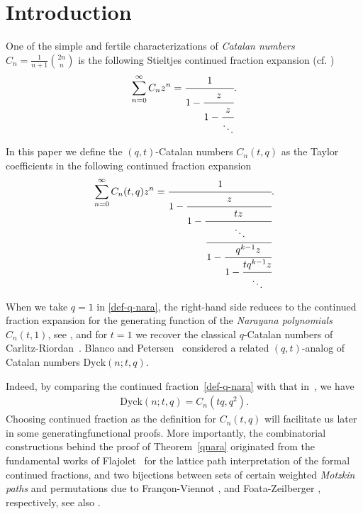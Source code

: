 \documentclass[12pt,reqno]{amsart}
\numberwithin{equation}{section}
\theoremstyle{plain}
\theoremstyle{definition}
\def\Dyck{\text{Dyck}}
\begin{document}
\tableofcontents


\section{Introduction}\label{sec1: Intro}









One of the simple and fertile characterizations of \emph{Catalan numbers} $C_n=\frac{1}{n+1}{2n\choose n}$ is  the following Stieltjes continued fraction expansion (cf. \cite{BCS08,Fl80})
\begin{align*}
\sum_{n=0}^\infty C_n z^n=
\cfrac{1}{
1-\cfrac{z}{1-\cfrac{z}{
\ddots}}}.
\end{align*}

 In this paper we
define  the  $(q,t)$-Catalan  numbers $C_n(t,q)$ as the Taylor coefficients in the following continued fraction expansion
\begin{equation}\label{def-q-nara}
\sum_{n=0}^\infty C_n(t,q) z^n=
\cfrac{1}{
1-\cfrac{z}{1-\cfrac{tz}{
\cfrac{\ddots}{1-\cfrac{q^{k-1}z}{1-\cfrac{tq^{k-1}z}{\ddots}
}}}}}.





\end{equation}

When we take $q=1$ in \eqref{def-q-nara}, the right-hand side reduces to the continued fraction expansion for the generating function of the \emph{Narayana polynomials} $C_n(t,1)$, see \cite{BCS08}, and for $t=1$ we recover the classical $q$-Catalan numbers of Carlitz-Riordan~\cite{CR64}. Blanco and Petersen~\cite{BP14} considered a related $(q,t)$-analog of Catalan numbers $\Dyck(n; t,q)$.
 






Indeed, by comparing the continued fraction~\eqref{def-q-nara} with that in~\cite[Proposition~2.6]{BP14},  we have
 \begin{align}\label{comb2-q-nara}
\Dyck(n; t,q)=C_n(tq,q^2).
\end{align}
Choosing continued fraction as the definition for $C_n(t,q)$ will facilitate us later in some generatingfunctional proofs. More importantly, the combinatorial constructions behind the proof of Theorem~\ref{qnara} originated from the fundamental works of Flajolet~\cite{Fl80} for the lattice path interpretation of the formal continued fractions, and two bijections between sets of certain weighted  \emph{Motzkin paths} and permutations  due to Fran\c con-Viennot \cite{FV}, and Foata-Zeilberger \cite{FZ}, respectively, see also \cite{CSZ, SZ10, SZ12}.
\end{document}
